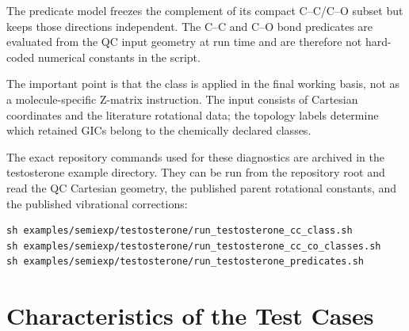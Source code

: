 \documentclass[12pt]{article}
\begin{document}
The predicate model freezes the complement of its compact C--C/C--O subset but
keeps those directions independent. The C--C and C--O bond predicates are
evaluated from the QC input geometry at run time and are therefore not
hard-coded numerical constants in the script.

The important point is that the class is applied in the final working basis,
not as a molecule-specific Z-matrix instruction. The input consists of Cartesian
coordinates and the literature rotational data; the topology labels determine
which retained GICs belong to the chemically declared classes.

The exact repository commands used for these diagnostics are archived in the
testosterone example directory. They can be run from the repository root and
read the QC Cartesian geometry, the published parent rotational constants, and
the published vibrational corrections:
\begin{lstlisting}
sh examples/semiexp/testosterone/run_testosterone_cc_class.sh
sh examples/semiexp/testosterone/run_testosterone_cc_co_classes.sh
sh examples/semiexp/testosterone/run_testosterone_predicates.sh
\end{lstlisting}

\section{Characteristics of the Test Cases}
\end{document}
